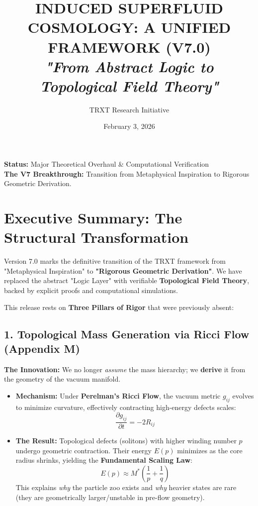 \documentclass[11pt,a4paper]{article}
\title{\textbf{INDUCED SUPERFLUID COSMOLOGY: A UNIFIED FRAMEWORK (V7.0)} \\ \large \textit{"From Abstract Logic to Topological Field Theory"}}
\author{TRXT Research Initiative}
\date{February 3, 2026}
\begin{document}
\maketitle

\begin{mdframed}[backgroundcolor=gray!10]
\textbf{Status:} Major Theoretical Overhaul \& Computational Verification \\
\textbf{The V7 Breakthrough:} Transition from Metaphysical Inspiration to Rigorous Geometric Derivation.
\end{mdframed}

\section{Executive Summary: The Structural Transformation}

Version 7.0 marks the definitive transition of the TRXT framework from "Metaphysical Inspiration" to \textbf{"Rigorous Geometric Derivation"}. We have replaced the abstract "Logic Layer" with verifiable \textbf{Topological Field Theory}, backed by explicit proofs and computational simulations.

This release rests on \textbf{Three Pillars of Rigor} that were previously absent:

\subsection{1. Topological Mass Generation via Ricci Flow (Appendix M)}
\textbf{The Innovation:} We no longer \textit{assume} the mass hierarchy; we \textbf{derive} it from the geometry of the vacuum manifold.

\begin{itemize}
    \item \textbf{Mechanism:} Under \textbf{Perelman’s Ricci Flow}, the vacuum metric $g_{ij}$ evolves to minimize curvature, effectively contracting high-energy defects scales:
    \begin{equation}
        \frac{\partial g_{ij}}{\partial t} = -2R_{ij}
    \end{equation}
    
    \item \textbf{The Result:} Topological defects (solitons) with higher winding number $p$ undergo geometric contraction. Their energy $E(p)$ minimizes as the core radius shrinks, yielding the \textbf{Fundamental Scaling Law}:
    \begin{equation}
        \boxed{ E(p) \approx M^* \left( \frac{1}{p} + \frac{1}{q} \right) }
    \end{equation}
    This explains \textit{why} the particle zoo exists and \textit{why} heavier states are rare (they are geometrically larger/unstable in pre-flow geometry).
\end{itemize}
\end{document}
